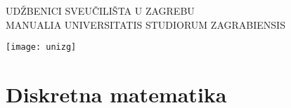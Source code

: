 \documentclass[
b5cijeli,
11pt,
twoside,
]{hrbook}
\begin{document}
\frontmatter

\thispagestyle{empty}
\begin{flushright}
\MakeUppercase{Ud\v{z}benici sveu\v{c}ili\v{s}ta u Zagrebu}\\
\MakeUppercase{Manualia Universitatis Studiorum Zagrabiensis}
\end{flushright}
\vfill
\begin{flushright}
\texttt{[image: unizg]}
\end{flushright}



\newpage

    

\newpage

    \maketitle

\newpage







    {
    \small
    \tableofcontents
    }

    


\mainmatter


    \part{Diskretna matematika}


    
%
%
%
%
%
%
%
%
%
%
%
%
%
%
%
%
%
%
\end{document}
